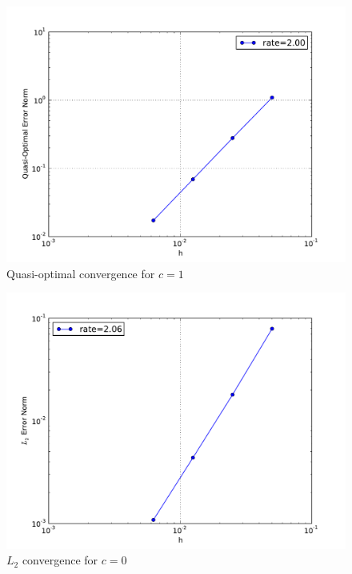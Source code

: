 \documentclass[10pt,letterpaper]{article}
\begin{document}
\begin{figure}[p]
\begin{center}
\includegraphics[width=5in]{epc1.pdf}
\end{center}
\caption{Quasi-optimal convergence for $c=1$}
\end{figure}

\begin{figure}[p]
\begin{center}
\includegraphics[width=5in]{ec0.pdf}
\end{center}
\caption{$L_2$ convergence for $c=0$}
\end{figure}
\end{document}
